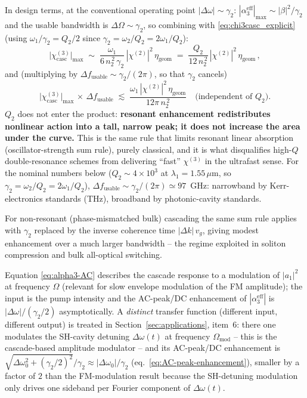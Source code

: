 \documentclass[11pt,a4paper]{article}
\newcommand{\chitwo}{\chi^{(2)}}
\newcommand{\chithree}{\chi^{(3)}}
\newcommand{\Dom}{\Delta\omega}
\begin{document}
In design terms, at the conventional operating point $|\Dom|\!\sim\!\gamma_2$:
$|\alpha_3^{\text{eff}}|_\text{max}\!\sim\!|\beta|^{2}/\gamma_2$ and
the usable bandwidth is $\Delta\Omega\!\sim\!\gamma_2$, so combining
with \eqref{eq:chi3casc_explicit} (using $\omega_1/\gamma_2 = Q_2/2$
since $\gamma_2 = \omega_2/Q_2 = 2\omega_1/Q_2$):
\begin{equation}
  \bigl|\chithree_\text{casc}\bigr|_\text{max}\;\sim\;
       \frac{\omega_1}{6\,n_2^{\,2}\,\gamma_2}\,|\chitwo|^2\,\eta_\text{geom}
       \;=\;\frac{Q_2}{12\,n_2^{\,2}}\,|\chitwo|^2\,\eta_\text{geom}\,,
  \label{eq:chi3-max}
\end{equation}
and (multiplying by $\Delta f_\text{usable}\sim\gamma_2/(2\pi)$, so that
$\gamma_2$ cancels)
\begin{equation}
  \boxed{\;\bigl|\chithree_\text{casc}\bigr|_\text{max}\,\times\,\Delta f_\text{usable}
          \;\lesssim\;\frac{\omega_1\,|\chitwo|^2\,\eta_\text{geom}}{12\pi\,n_2^{\,2}}
          \quad\text{(independent of }Q_2\text{).}\;}
  \label{eq:sum-rule}
\end{equation}
$Q_2$ does not enter the product: \textbf{resonant enhancement
redistributes nonlinear action into a tall, narrow peak; it does not
increase the area under the curve.}  This is the same rule that
limits resonant linear absorption (oscillator-strength sum rule),
purely classical, and it is what disqualifies high-$Q$
double-resonance schemes from delivering ``fast'' $\chithree$ in the
ultrafast sense.  For the nominal numbers below ($Q_2\sim 4{\times}10^3$
at $\lambda_1=1.55\,\mu$m, so $\gamma_2=\omega_2/Q_2=2\omega_1/Q_2$),
$\Delta f_\text{usable}\sim\gamma_2/(2\pi)\simeq 97$~GHz: narrowband
by Kerr-electronics standards (THz), broadband by photonic-cavity
standards.

For non-resonant (phase-mismatched bulk) cascading the same sum rule
applies with $\gamma_2$ replaced by the inverse coherence time
$|\Delta k|\,v_g$, giving modest enhancement over a much larger
bandwidth -- the regime exploited in soliton compression and bulk
all-optical switching.

Equation \eqref{eq:alpha3-AC} describes the cascade response to a
modulation of $|a_1|^{2}$ at frequency $\Omega$ (relevant for slow
envelope modulation of the FM amplitude); the input is the pump
intensity and the AC-peak/DC enhancement of $|\alpha_3^\text{eff}|$ is
$|\Dom|/(\gamma_2/2)$ asymptotically.  A \emph{distinct} transfer
function (different input, different output) is treated in
Section~\ref{sec:applications}, item~6: there one modulates the
SH-cavity detuning $\Dom(t)$ at frequency $\Omega_\text{mod}$ -- this
is the cascade-based amplitude modulator -- and its AC-peak/DC
enhancement is $\sqrt{\Dom_0^{2}+(\gamma_2/2)^{2}}/\gamma_2\approx
|\Dom_0|/\gamma_2$ (eq.~\eqref{eq:AC-peak-enhancement}), smaller by a
factor of $2$ than the FM-modulation result because the SH-detuning
modulation only drives one sideband per Fourier component of $\Dom(t)$.
\end{document}
